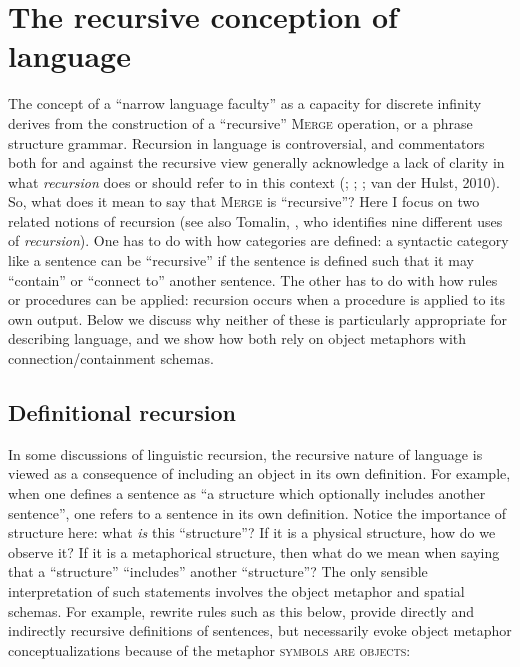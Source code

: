 \section{The recursive conception of language}

The concept of a “narrow language faculty” as a capacity for discrete infinity derives from the construction of a “recursive” \textsc{Merge} operation, or a phrase structure grammar. Recursion in language is controversial, and commentators both for and against the recursive view generally acknowledge a lack of clarity in what \textit{recursion} does or should refer to in this context (\citealt{Lobina2011}; \citealt{PullumScholz2010}; \citealt{Tomalin2011}; van der Hulst, 2010). So, what does it mean to say that \textsc{Merge} is “recursive”? Here I focus on two related notions of recursion (see also Tomalin, , who identifies nine different uses of \textit{recursion}). One has to do with how categories are defined: a syntactic category like a sentence can be “recursive” if the sentence is defined such that it may “contain” or “connect to” another sentence. The other has to do with how rules or procedures can be applied: recursion occurs when a procedure is applied to its own output. Below we discuss why neither of these is particularly appropriate for describing language, and we show how both rely on object metaphors with connection/containment schemas.

\subsection{Definitional recursion}

In some discussions of linguistic recursion, the recursive nature of language is viewed as a consequence of including an object in its own definition. For example, when one defines a sentence as “a structure which optionally includes another sentence”, one refers to a sentence in its own definition. Notice the importance of structure here: what \textit{is} this “structure”? If it is a physical structure, how do we observe it? If it is a metaphorical structure, then what do we mean when saying that a “structure” “includes” another “structure”? The only sensible interpretation of such statements involves the object metaphor and spatial schemas. For example, rewrite rules such as this below, provide directly and indirectly recursive definitions of sentences, but necessarily evoke object metaphor conceptualizations because of the metaphor \textsc{symbols are objects}:

